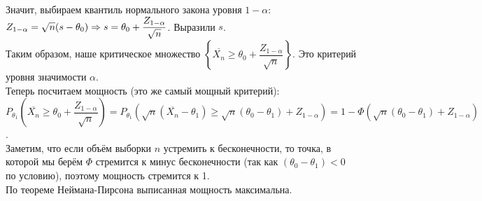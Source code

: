 \begin{example}
    Значит, выбираем квантиль нормального закона уровня $1 - \alpha$:
    $Z_{1 - \alpha} = \sqrt{n}(s - \theta_0) \Rightarrow \\ s = \theta_0 + \dfrac{Z_{1 - \alpha}}{\sqrt{n}}$. Выразили
    $s$.  \\
    
    Таким образом, наше критическое множество $\left \{ \overline{X_n} \geqslant \theta_0 + \dfrac{Z_{1 - \alpha}}{\sqrt{n}}\right \}$. Это
    критерий уровня значимости $\alpha$. \\

    Теперь посчитаем мощность (это же самый мощный критерий): \\
    $P_{\theta_1}\left (\overline{X_n} \geqslant \theta_0 + \dfrac{Z_{1 - \alpha}}{\sqrt{n}} \right) = 
    P_{\theta_1}\left (\sqrt{n}(\overline{X_n} - \theta_1) \geqslant \sqrt{n}(\theta_0
    - \theta_1) + Z_{1 - \alpha} \right) = 1 - \Phi(\sqrt{n}(\theta_0
    - \theta_1) + Z_{1 - \alpha})$. \\
    
    Заметим, что если объём выборки $n$ устремить к бесконечности, то точка, в которой мы берём
    $\Phi$ стремится к минус бесконечности (так как $(\theta_0
    - \theta_1) < 0$ по условию), поэтому мощность стремится к 1.\\
    
    По теореме Неймана-Пирсона выписанная мощность максимальна.
\end{example}
